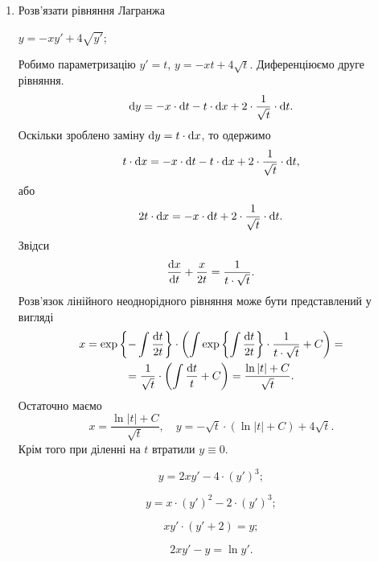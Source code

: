 \begin{enumerate}
\item Розв’язати рівняння Лагранжа
\begin{example}
	$y = - x y' + 4 \sqrt{y'}$;
\end{example}
\begin{solution}
	Робимо параметризацію $y' = t$, $y = - xt + 4 \sqrt{t}$. Диференціюємо друге рівняння.
	\[ \mathop{}\!\mathrm{d} y = - x \cdot \mathop{}\!\mathrm{d} t - t \cdot \mathop{}\!\mathrm{d} x + 2 \cdot \frac{1}{\sqrt{t}} \cdot \mathop{}\!\mathrm{d} t.\]
	Оскільки зроблено заміну $\mathop{}\!\mathrm{d} y = t \cdot \mathop{}\!\mathrm{d} x$, то одержимо
	\[ t \cdot \mathop{}\!\mathrm{d} x = - x \cdot \mathop{}\!\mathrm{d} t - t \cdot \mathop{}\!\mathrm{d} x + 2 \cdot \frac{1}{\sqrt{t}} \cdot \mathop{}\!\mathrm{d} t,\]
	або
	\[ 2 t \cdot \mathop{}\!\mathrm{d} x = - x \cdot \mathop{}\!\mathrm{d} t + 2 \cdot \frac{1}{\sqrt{t}} \cdot \mathop{}\!\mathrm{d} t.\]
	Звідси
	\[ \frac{\mathop{}\!\mathrm{d} x}{\mathop{}\!\mathrm{d} t} + \frac{x}{2t} = \frac{1}{t \cdot \sqrt{t}}.\]
	Розв’язок лінійного неоднорідного рівняння може бути представлений у вигляді
	\begin{multline*}
		x = \exp\left\{ - \int \frac{\mathop{}\!\mathrm{d} t}{2t} \right\} \cdot \left( \int \exp\left\{\int \frac{\mathop{}\!\mathrm{d} t}{2t} \right\} \cdot \frac{1}{t\cdot\sqrt{t}} + C\right) = \\
		= \frac{1}{\sqrt{t}} \cdot \left(\int \frac {\mathop{}\!\mathrm{d} t}{t} + C\right) = \frac{\ln |t| + C}{\sqrt{t}}.
	\end{multline*}
	Остаточно маємо \[ x = \frac{\ln |t| + C}{\sqrt{t}}, \quad y = - \sqrt{t} \cdot (\ln |t| + C) + 4 \sqrt{t}. \] Крім того при діленні на $t$ втратили $y \equiv 0$.
\end{solution}
\begin{multicols}{2}
\begin{problem}
	\[ y = 2 x y' - 4 \cdot (y')^3;\]
\end{problem}
\begin{problem}
	\[ y = x \cdot (y')^2 - 2 \cdot (y')^3;\]
\end{problem}
\begin{problem}
 	\[ x y' \cdot (y' + 2) = y;\]
\end{problem}
\begin{problem}
 	\[ 2 x y' - y = \ln y'.\]
\end{problem}
\end{multicols}


\end{enumerate}
